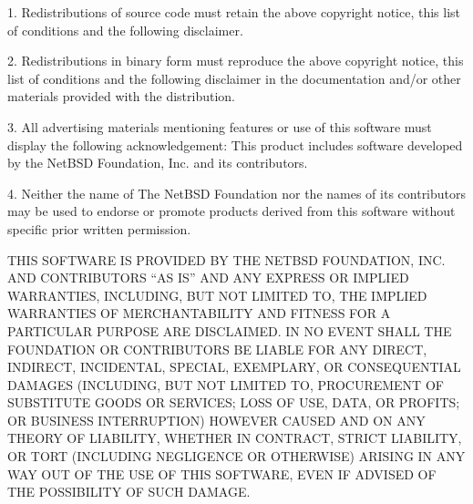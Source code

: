 \documentclass[a4paper,twoside]{tceusermanual}
\begin{document}
   1. Redistributions of source code must retain the above copyright
      notice, this list of conditions and the following disclaimer.

   2. Redistributions in binary form must reproduce the above copyright
      notice, this list of conditions and the following disclaimer in the
      documentation and/or other materials provided with the distribution.

   3. All advertising materials mentioning features or use of this software
      must display the following acknowledgement:
        This product includes software developed by the NetBSD
        Foundation, Inc. and its contributors.

   4. Neither the name of The NetBSD Foundation nor the names of its
      contributors may be used to endorse or promote products derived
      from this software without specific prior written permission.
  
   THIS SOFTWARE IS PROVIDED BY THE NETBSD FOUNDATION, INC. AND CONTRIBUTORS
   ``AS IS'' AND ANY EXPRESS OR IMPLIED WARRANTIES, INCLUDING, BUT NOT LIMITED
   TO, THE IMPLIED WARRANTIES OF MERCHANTABILITY AND FITNESS FOR A PARTICULAR
   PURPOSE ARE DISCLAIMED.  IN NO EVENT SHALL THE FOUNDATION OR CONTRIBUTORS
   BE LIABLE FOR ANY DIRECT, INDIRECT, INCIDENTAL, SPECIAL, EXEMPLARY, OR
   CONSEQUENTIAL DAMAGES (INCLUDING, BUT NOT LIMITED TO, PROCUREMENT OF
   SUBSTITUTE GOODS OR SERVICES; LOSS OF USE, DATA, OR PROFITS; OR BUSINESS
   INTERRUPTION) HOWEVER CAUSED AND ON ANY THEORY OF LIABILITY, WHETHER IN
   CONTRACT, STRICT LIABILITY, OR TORT (INCLUDING NEGLIGENCE OR OTHERWISE)
   ARISING IN ANY WAY OUT OF THE USE OF THIS SOFTWARE, EVEN IF ADVISED OF THE
   POSSIBILITY OF SUCH DAMAGE.


\cleardoublepage

\end{document}
